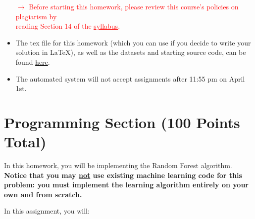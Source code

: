 \documentclass[letterpaper]{article}
\begin{document}
\begin{itemize}
    \begin{center}
    \textcolor{red}{$\rightarrow$ Before starting this homework, please review this course's policies on plagiarism by  \\reading Section 14 of the \href{https://people.cs.umass.edu/~bsilva/courses/CMPSCI_589/Spring2024/S24_589_Syllabus_v2.0.pdf\#page=5}{\textcolor{red}{\underline{syllabus}}}.}
    \end{center}

    \item The tex file for this homework (which you can use if you decide to write your solution in \LaTeX), as well as the datasets and starting source code, can be found \href{https://people.cs.umass.edu/~bsilva/courses/CMPSCI_589/Spring2024/homeworks/hw3.zip}{here}.

    \item The automated system will not accept assignments after 11:55 pm on April 1st.    
\end{itemize}
\newpage

\vspace{1cm}
\section*{Programming Section (100 Points Total)}

In this homework, you will be implementing the Random Forest algorithm. \textbf{Notice that you may \ul{not} use existing machine learning code for this problem: you must implement the learning algorithm entirely on your own and from scratch.} 


In this assignment, you will:
\end{document}
